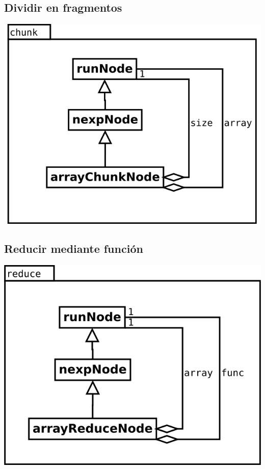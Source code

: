 \subsection {Dividir en fragmentos}
\begin{center}
\includegraphics[scale=0.4]{chunk.png} \\
\end{center}

\subsection {Reducir mediante función}
\begin{center}
\includegraphics[scale=0.4]{reduce.png} \\
\end{center}

